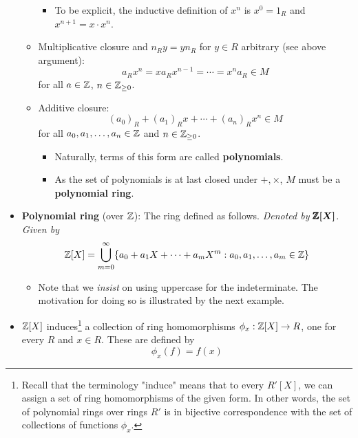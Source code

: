 \documentclass[../notes.tex]{subfiles}
\begin{document}
\begin{itemize}
\begin{itemize}
\begin{itemize}
            \item To be explicit, the inductive definition of $x^n$ is $x^0=1_R$ and $x^{n+1}=x\cdot x^n$.
        \end{itemize}
        \item Multiplicative closure and $n_Ry=yn_R$ for $y\in R$ arbitrary (see above argument):
        \begin{equation*}
            a_Rx^n=xa_Rx^{n-1}=\cdots=x^na_R \in M
        \end{equation*}
        for all $a\in\mathbb{Z}$, $n\in{\mathbb{Z}_{\geq 0}}$.
        \item Additive closure:
        \begin{equation*}
            (a_0)_R+(a_1)_Rx+\cdots+(a_n)_Rx^n \in M
        \end{equation*}
        for all $a_0,a_1,\dots,a_n\in\mathbb{Z}$ and $n\in{\mathbb{Z}_{\geq 0}}$.
        \begin{itemize}
            \item Naturally, terms of this form are called \textbf{polynomials}.
            \item As the set of polynomials is at last closed under $+,\times$, $M$ must be a \textbf{polynomial ring}.
        \end{itemize}
    \end{itemize}
    \pagebreak
    \item \textbf{Polynomial ring} (over $\mathbb{Z}$): The ring defined as follows. \emph{Denoted by} $\bm{\pmb{\mathbb{Z}}[X]}$. \emph{Given by}
    \begin{equation*}
        \mathbb{Z}[X] = \bigcup_{m=0}^\infty\{a_0+a_1X+\cdots+a_mX^m:a_0,a_1,\dots,a_m\in\mathbb{Z}\}
    \end{equation*}
    \begin{itemize}
        \item Note that we \emph{insist} on using uppercase for the indeterminate. The motivation for doing so is illustrated by the next example.
    \end{itemize}
    \item $\mathbb{Z}[X]$ induces\footnote{Recall that the terminology "induce" means that to every $R'[X]$, we can assign a set of ring homomorphisms of the given form. In other words, the set of polynomial rings over rings $R'$ is in bijective correspondence with the set of collections of functions $\phi_x$.} a collection of ring homomorphisms $\phi_x:\mathbb{Z}[X]\to R$, one for every $R$ and $x\in R$. These are defined by
    \begin{equation*}
        \phi_x(f) = f(x)
    \end{equation*}

\end{itemize}
\end{document}
